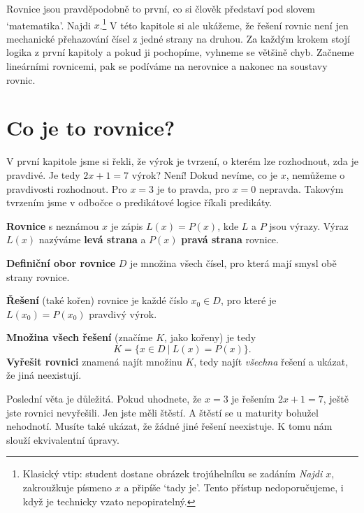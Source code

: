 \label{kap:rovnice}

Rovnice jsou pravděpodobně to první, co si člověk představí pod slovem `matematika'. Najdi $x$.\footnote{Klasický vtip: student dostane obrázek trojúhelníku se zadáním \textit{Najdi $x$}, zakroužkuje písmeno $x$ a připíše `tady je'. Tento přístup nedoporučujeme, i když je technicky vzato nepopiratelný.} V této kapitole si ale ukážeme, že řešení rovnic není jen mechanické přehazování čísel z jedné strany na druhou. Za každým krokem stojí logika z první kapitoly a pokud ji pochopíme, vyhneme se většině chyb. Začneme lineárními rovnicemi, pak se podíváme na nerovnice a nakonec na soustavy rovnic.

\section{Co je to rovnice?}\label{sec:co-je-rovnice}

V první kapitole jsme si řekli, že výrok je tvrzení, o kterém lze rozhodnout, zda je pravdivé. Je tedy $2x + 1 = 7$ výrok? Není! Dokud nevíme, co je $x$, nemůžeme o pravdivosti rozhodnout. Pro $x = 3$ je to pravda, pro $x = 0$ nepravda. Takovým tvrzením jsme v odbočce o predikátové logice říkali predikáty.

\begin{definitionbox}
  \textbf{Rovnice} s neznámou $x$ je zápis $L(x) = P(x)$, kde $L$ a $P$ jsou výrazy. Výraz $L(x)$ nazýváme \textbf{levá strana} a $P(x)$ \textbf{pravá strana} rovnice.

  \vspace{0.2cm}

  \textbf{Definiční obor rovnice} $D$ je množina všech čísel, pro která mají smysl obě strany rovnice.

  \textbf{Řešení} (také kořen) rovnice je každé číslo $x_0\in D$, pro které je $L(x_0) = P(x_0)$ pravdivý výrok.

  \textbf{Množina všech řešení} (značíme $K$, jako kořeny) je tedy
  \begin{equation*}
    K = \{x\in D\ |\ L(x) = P(x)\}.
  \end{equation*}
  \textbf{Vyřešit rovnici} znamená najít množinu $K$, tedy najít \textit{všechna} řešení a ukázat, že jiná neexistují.
\end{definitionbox}

Poslední věta je důležitá. Pokud uhodnete, že $x = 3$ je řešením $2x + 1 = 7$, ještě jste rovnici nevyřešili. Jen jste měli štěstí. A štěstí se u maturity bohužel nehodnotí. Musíte také ukázat, že žádné jiné řešení neexistuje. K tomu nám slouží ekvivalentní úpravy.

